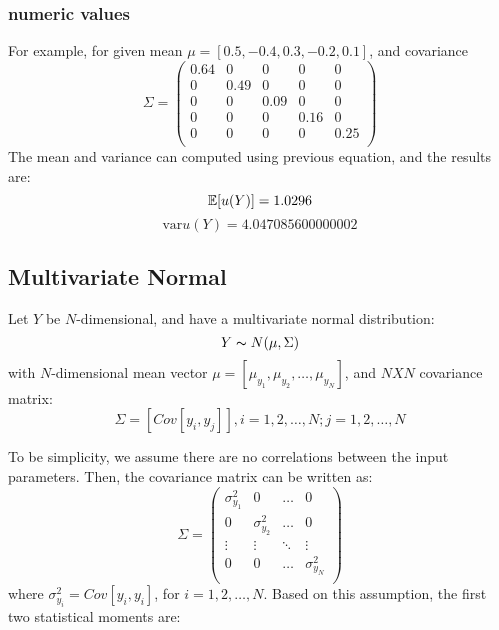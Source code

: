 \subsubsection{numeric values}
For example, for given mean $\mu = [0.5, -0.4, 0.3, -0.2, 0.1]$, and covariance
\begin{equation}
\Sigma =
\begin{pmatrix}
0.64 & 0 & 0 & 0 & 0 \\
0 & 0.49 & 0 & 0 & 0 \\
0 & 0 & 0.09 & 0 & 0 \\
0 & 0 & 0 & 0.16 & 0 \\
0 & 0 & 0 & 0 & 0.25 \\
\end{pmatrix}
\end{equation}
The mean and variance can computed using previous equation, and the results are:
\begin{equation}
\mathbb{E}[ u(Y)] = 1.0296
\end{equation}
\begin{equation}
\text{var}{u(Y)} = 4.047085600000002
\end{equation}

\subsection{Multivariate Normal}
Let $Y$ be $N$-dimensional, and have a multivariate normal distribution:
\begin{equation}
Y \thicksim N(\mu,\Sigma)
\end{equation}
with $N$-dimensional mean vector $\mu=[\mu_{y_1},\mu_{y_2},\ldots,\mu_{y_N}]$, and $N X N$ covariance matrix:
\begin{equation}
\Sigma = [Cov[y_i,y_j]],i = 1,2,\ldots,N; j = 1,2,\ldots,N
\end{equation}

To be simplicity, we assume there are no correlations between the input parameters. Then, the covariance matrix can be written
as:
\begin{equation}
\Sigma =
\begin{pmatrix}
\sigma_{y_1}^2 & 0 &\ldots & 0 \\
0 & \sigma_{y_2}^2 &\ldots & 0 \\
\vdots &\vdots &\ddots & \vdots \\
0 & 0 & \ldots & \sigma_{y_N}^2\\
\end{pmatrix}
\end{equation}
where $\sigma_{y_i}^2 = Cov[y_i,y_i]$, for $i = 1,2,\ldots,N$. Based on this assumption, the first two statistical moments are:

